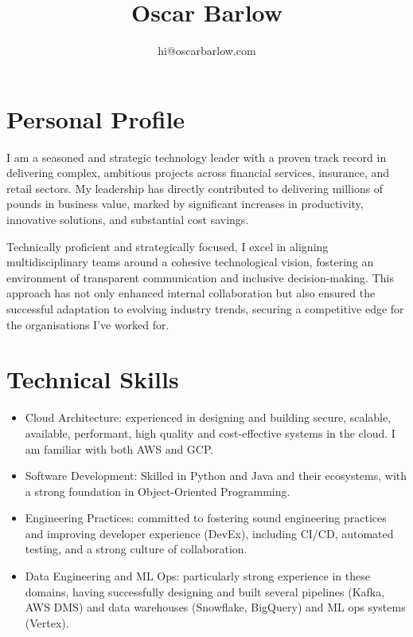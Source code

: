 \documentclass[a4paper]{scrartcl}
\date{}
\begin{document}
\title{Oscar Barlow}
\subtitle{hi@oscarbarlow.com}
\maketitle

\section*{Personal Profile}
I am a seasoned and strategic technology leader with a proven track record in
delivering complex, ambitious projects across financial services, insurance,
and retail sectors. My leadership has directly contributed to delivering
millions of pounds in business value, marked by significant increases in
productivity, innovative solutions, and substantial cost savings.

Technically proficient and strategically focused, I excel in aligning
multidisciplinary
teams around a cohesive technological vision, fostering an environment of
transparent communication and inclusive decision-making. This approach has not
only enhanced internal collaboration but also ensured the successful adaptation
to evolving industry trends, securing a competitive edge for the organisations
I've worked for.

\section*{Technical Skills}
\begin{itemize}
      \item Cloud Architecture: experienced in designing and building secure,
            scalable, available, performant, high quality and cost-effective
            systems in the
            cloud. I am familiar with both AWS and GCP.
      \item Software Development: Skilled in Python and Java and their
            ecosystems, with a
            strong foundation in Object-Oriented Programming.
      \item Engineering Practices: committed to fostering sound engineering
            practices and improving developer experience (DevEx), including
            CI/CD,
            automated testing, and a strong culture of collaboration.
      \item Data Engineering and ML Ops: particularly strong experience in
            these domains, having successfully designing and built several
            pipelines (Kafka, AWS DMS) and data warehouses (Snowflake,
            BigQuery)
            and ML ops systems (Vertex).
\end{itemize}
\end{document}
